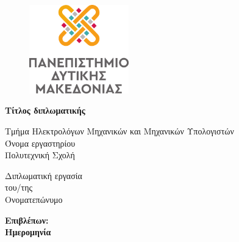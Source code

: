 \begin{titlepage}


\begin{figure}[h!]
  \begin{center}
  \vspace{-1cm}
    \includegraphics[width=4.3cm]{logos/gr/uowm-logo-vertical-gr.png}
    \label{fig:cover_uowm_logo}
  \end{center}
\end{figure}

\vspace{\fill}

\Large \centering \textbf{Τίτλος διπλωματικής}

\vspace{\fill}

\begin{center}
    \normalsize Τμήμα Ηλεκτρολόγων Μηχανικών και Μηχανικών Υπολογιστών \\
    \normalsize Όνομα εργαστηρίου \\
    \normalsize Πολυτεχνική Σχολή
\end{center}

\vspace{\fill}

\begin{center}
    \normalsize Διπλωματική εργασία \\
    \normalsize του/της \\
    \normalsize Ονοματεπώνυμο
\end{center}

\vspace{\fill}

\begin{center}
    \normalsize \textbf{Επιβλέπων:} \\
    \normalsize \textbf{Ημερομηνία}
\end{center}

\end{titlepage}
